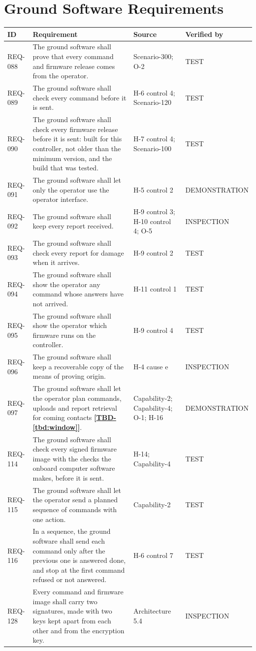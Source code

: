 \documentclass[11pt,a4paper]{article}
\newcommand{\tbd}[1]{\mbox{\textbf{[\hyperref[tbd:#1]{TBD-\ref*{tbd:#1}}]}}}
\begin{document}
\section{Ground Software Requirements}
{\footnotesize
\begin{xltabular}{\textwidth}{@{}l>{\raggedright\arraybackslash}X>{\raggedright\arraybackslash}p{3.2cm}>{\raggedright\arraybackslash}p{3.0cm}@{}}
\toprule
ID & Requirement & Source & Verified by \\
\midrule
\endhead
REQ-088 & The ground software shall prove that every command and firmware release comes from the operator. & Scenario-300; O-2 & TEST \\
REQ-089 & The ground software shall check every command before it is sent. & H-6 control 4; Scenario-120 & TEST \\
REQ-090 & The ground software shall check every firmware release before it is sent: built for this controller, not older than the minimum version, and the build that was tested. & H-7 control 4; Scenario-100 & TEST \\
REQ-091 & The ground software shall let only the operator use the operator interface. & H-5 control 2 & DEMONSTRATION \\
REQ-092 & The ground software shall keep every report received. & H-9 control 3; H-10 control 4; O-5 & INSPECTION \\
REQ-093 & The ground software shall check every report for damage when it arrives. & H-9 control 2 & TEST \\
REQ-094 & The ground software shall show the operator any command whose answers have not arrived. & H-11 control 1 & TEST \\
REQ-095 & The ground software shall show the operator which firmware runs on the controller. & H-9 control 4 & TEST \\
REQ-096 & The ground software shall keep a recoverable copy of the means of proving origin. & H-4 cause e & INSPECTION \\
REQ-097 & The ground software shall let the operator plan commands, uploads and report retrieval for coming contacts \tbd{window}. & Capability-2; Capability-4; O-1; H-16 & DEMONSTRATION \\
REQ-114 & The ground software shall check every signed firmware image with the checks the onboard computer software makes, before it is sent. & H-14; Capability-4 & TEST \\
REQ-115 & The ground software shall let the operator send a planned sequence of commands with one action. & Capability-2 & TEST \\
REQ-116 & In a sequence, the ground software shall send each command only after the previous one is answered done, and stop at the first command refused or not answered. & H-6 control 7 & TEST \\
REQ-128 & Every command and firmware image shall carry two signatures, made with two keys kept apart from each other and from the encryption key. & Architecture 5.4 & INSPECTION \\
\bottomrule
\end{xltabular}}
\end{document}

